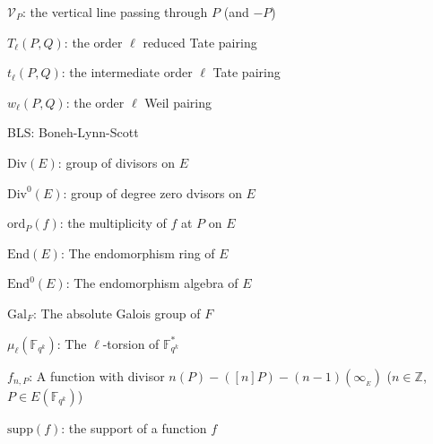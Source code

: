 \documentclass[11pt, lettersize, notitlepage, leqno, footskip=0.6cm]{article}
\newcommand{\bz}{\mathbb Z}
\newcommand{\bFqk}{\mathbb{F}_{q^k}}
\newcommand{\absf}{\mathrm{Gal}_F}
\newcommand{\mc}{\mathcal}
\newcommand{\mr}{\mathrm}
\newcommand{\noin}{\noindent}
\newcommand{\End}{\mr{End}}
\numberwithin{equation}{section}
\begin{document}
\noin $\mc{V}_{P}$: the vertical line passing through $P$ (and $-P$) \vspace{2mm}

\noin $T_{\ell}(P,Q)$: the order $\ell$ reduced Tate pairing \vspace{2mm}

\noin $t_{\ell}(P,Q)$: the intermediate order $\ell$ Tate pairing \vspace{2mm}

\noin $w_{\ell}(P,Q)$: the order $\ell$ Weil pairing  \vspace{2mm}

\noin BLS: Boneh-Lynn-Scott \vspace{2mm}

\noin $\mr{Div}(E)$: group of divisors on $E$ \vspace{2mm}

\noin $\mr{Div}^0(E)$: group of degree zero dvisors on $E$ \vspace{2mm}

\noin $\mr{ord}_P(f)$: the multiplicity of $f$ at $P$ on $E$ \vspace{2mm}

\noin $\End(E)$: The endomorphism ring of $E$  \vspace{2mm}

\noin $\End^0(E)$: The endomorphism algebra of $E$ \vspace{2mm}

\noin $\absf$: The absolute Galois group of $F$ \vspace{2mm}

\noin $\mu_{\ell}(\bFqk)$: The $\ell$-torsion of $\bFqk^*$ \vspace{2mm}

\noin $f_{n,P}$: A function with divisor $n(P)-([n]P)- (n-1)(\infty_{_E})$ \hspace{2mm} ($n\in \bz$, $P\in E(\bFqk)$) \vspace{2mm}

\noin $\mr{supp}(f)$: the support of a function $f$ \vspace{2mm}
\end{document}
